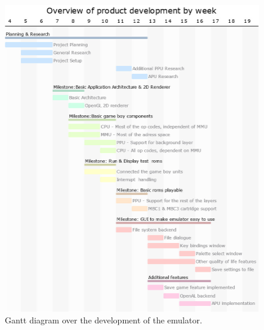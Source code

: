 \\\\
\newpage
\begin{figure}[H]
    \centering
    \includegraphics[width =\textwidth]{figures/Gantt diagram.jpg}
    \caption{Gantt diagram over the development of the emulator.}
    \label{fig:gantt_diagram}
\end{figure}
\newpage
